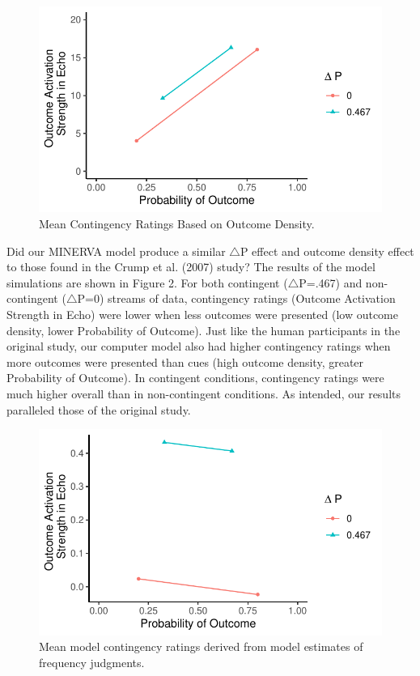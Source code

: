 \documentclass[
  english,
  man,floatsintext]{apa6}
\begin{document}
\begin{figure}

{\centering \includegraphics{thesis_files/figure-latex/unnamed-chunk-5-1} 

}

\caption{Mean Contingency Ratings Based on Outcome Density.}\label{fig:unnamed-chunk-5}
\end{figure}

Did our MINERVA model produce a similar \(\triangle\)P effect and outcome density effect to those found in the Crump et al. (2007) study? The results of the model simulations are shown in Figure 2. For both contingent (\(\triangle\)P=.467) and non-contingent (\(\triangle\)P=0) streams of data, contingency ratings (Outcome Activation Strength in Echo) were lower when less outcomes were presented (low outcome density, lower Probability of Outcome). Just like the human participants in the original study, our computer model also had higher contingency ratings when more outcomes were presented than cues (high outcome density, greater Probability of Outcome). In contingent conditions, contingency ratings were much higher overall than in non-contingent conditions. As intended, our results paralleled those of the original study.

\begin{figure}

{\centering \includegraphics{thesis_files/figure-latex/unnamed-chunk-7-1} 

}

\caption{Mean model contingency ratings derived from model estimates of frequency judgments.}\label{fig:unnamed-chunk-7}
\end{figure}
\end{document}
